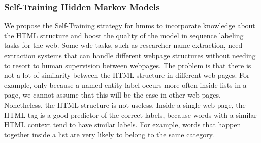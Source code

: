 \documentclass{nle}
\begin{document}
\subsubsection{Self-Training Hidden Markov Models} 
\label{sssec:self_training}

We propose the Self-Training strategy for \gls{hmm}s to incorporate knowledge about the HTML structure
and boost the quality of the model in sequence labeling tasks for the web.
Some \gls{wde} tasks, such as researcher name extraction, need extraction systems
that can handle different webpage structures without needing to resort to human supervision
between webpages. 
The problem is that there is not a lot of similarity between the HTML structure in different web pages.
For example, only because a named entity label occurs more often inside lists in a page, we cannot
assume that this will be the case in other web pages. 
Nonetheless, the HTML structure is not useless. Inside a single web page, the HTML tag is a good predictor
of the correct labels, because words with a similar HTML context tend to have similar labels. For example, words
that happen together inside a list are very likely to belong to the same category. 
\end{document}
